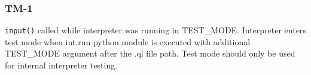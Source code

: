 \subsubsection{TM-1}\label{sec:error_code_tm_1}

\texttt{input()} called while interpreter was running in TEST\_MODE. 
Interpreter enters test mode when int.run python module is executed with 
additional TEST\_MODE argument after the .ql file path. Test mode should 
only be used for internal interpreter testing.
